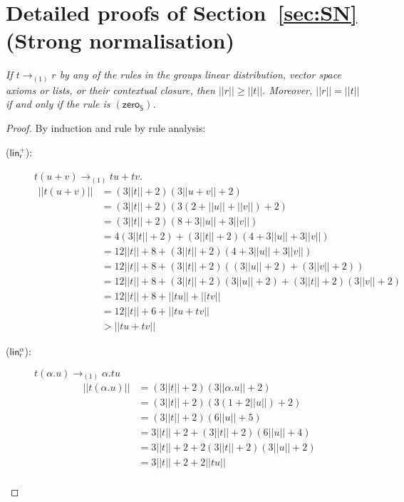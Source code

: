 \documentclass[preprint]{elsarticle}
\newcommand\size[1]{||#1||}
\newcommand\recap[3]{\noindent {\bf #1 \ref{#2}.} \emph{#3}}
\newcommand\lra[1][1]{\longrightarrow_{\left(#1\right)}}
\newcommand\s[1]{\ensuremath{\mathsf{#1}}}
\newcommand\rlinr{(\s{lin^+_r})}
\newcommand\rlinscalr{(\s{lin^\alpha_r})}
\newcommand\rzeroS{(\s{zero_S})}
\begin{document}
\section{Detailed proofs of Section~\ref{sec:SN} (Strong normalisation)}\label{ap:SN}
\recap{Lemma}{lem:size}{
  If \( t \lra r \) by any of the rules in the groups linear distribution,
  vector space axioms or lists, or their contextual closure, then $\size r \geq \size t$. Moreover, $\size r
  = \size t$ if and only if the rule is $\rzeroS$.
}
\begin{proof}
  By induction and rule by rule analysis:
 \begin{description}
 \item[\rlinr:] \( {t}{(u + v)} \lra {t}{u} + {t}{v} \).
   \begin{align*}
     \size{{t}{(u + v)}}
     & = (3 \size{t} + 2)(3 \size{u + v} + 2) \\
     & = (3 \size{t} + 2)(3 (2 + \size{u} + \size{v}) + 2) \\
     & = (3 \size{t} + 2)(8 + 3 \size{u} + 3 \size{v}) \\
     & = 4 (3 \size{t} + 2) + (3 \size{t} + 2)(4 + 3 \size{u} + 3 \size{v}) \\
     & = 12 \size{t} + 8 + (3 \size{t} + 2)(4 + 3 \size{u} + 3 \size{v}) \\
     & = 12 \size{t} + 8 + (3 \size{t} + 2)((3 \size{u} + 2) + (3 \size{v} + 2)) \\
     & = 12 \size{t} + 8 + (3 \size{t} + 2)(3 \size{u} + 2) + (3 \size{t} + 2)(3 \size{v} + 2) \\
     & = 12 \size{t} + 8 + \size{{t}{u}} + \size{{t}{v}} \\
     & = 12 \size{t} + 6 + \size{{t}{u} + {t}{v}} \\
     & > \size{{t}{u} + {t}{v}}
   \end{align*}
 \item[\rlinscalr:] \( {t}{(\alpha . u)} \lra \alpha . {t}{u} \)
   \begin{align*}
     \size{{t}{(\alpha . u)}}
     & = (3 \size{t} + 2)(3 \size{\alpha . u} + 2) \\
     & = (3 \size{t} + 2)(3 (1 + 2 \size{u}) + 2) \\
     & = (3 \size{t} + 2)(6 \size{u} + 5) \\
     & = 3 \size{t} + 2 + (3 \size{t} + 2)(6 \size{u} + 4) \\
     & = 3 \size{t} + 2 + 2 (3 \size{t} + 2)(3 \size{u} + 2) \\
     & = 3 \size{t} + 2 + 2 \size{{t}{u}} \\

\end{align*}
\end{description}
\end{proof}
\end{document}

